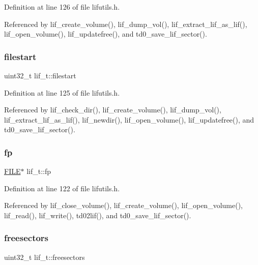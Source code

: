 Definition at line 126 of file lifutils.\+h.



Referenced by lif\+\_\+create\+\_\+volume(), lif\+\_\+dump\+\_\+vol(), lif\+\_\+extract\+\_\+lif\+\_\+as\+\_\+lif(), lif\+\_\+open\+\_\+volume(), lif\+\_\+updatefree(), and td0\+\_\+save\+\_\+lif\+\_\+sector().

\mbox{\label{structlif__t_a3c1bcc66b694d07ebc304ef7cb66b4ef}} 
\subsubsection{\texorpdfstring{filestart}{filestart}}
{\footnotesize\ttfamily uint32\+\_\+t lif\+\_\+t\+::filestart}



Definition at line 125 of file lifutils.\+h.



Referenced by lif\+\_\+check\+\_\+dir(), lif\+\_\+create\+\_\+volume(), lif\+\_\+dump\+\_\+vol(), lif\+\_\+extract\+\_\+lif\+\_\+as\+\_\+lif(), lif\+\_\+newdir(), lif\+\_\+open\+\_\+volume(), lif\+\_\+updatefree(), and td0\+\_\+save\+\_\+lif\+\_\+sector().

\mbox{\label{structlif__t_ad679ba16ca21371a649981a4cca9e64c}} 
\subsubsection{\texorpdfstring{fp}{fp}}
{\footnotesize\ttfamily \hyperlink{posix_8h_aed4dabeb9f7c518ded42f930a04abce8}{F\+I\+LE}$\ast$ lif\+\_\+t\+::fp}



Definition at line 122 of file lifutils.\+h.



Referenced by lif\+\_\+close\+\_\+volume(), lif\+\_\+create\+\_\+volume(), lif\+\_\+open\+\_\+volume(), lif\+\_\+read(), lif\+\_\+write(), td02lif(), and td0\+\_\+save\+\_\+lif\+\_\+sector().

\mbox{\label{structlif__t_a1fc11461eb5643d84e229772f7623152}} 
\subsubsection{\texorpdfstring{freesectors}{freesectors}}
{\footnotesize\ttfamily uint32\+\_\+t lif\+\_\+t\+::freesectors}



